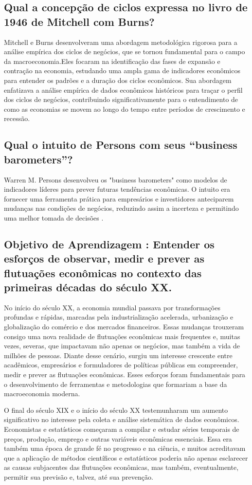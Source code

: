 \documentclass[12pt]{article}
\begin{document}
\subsection{\textbf{Qual a concepção de ciclos expressa no livro de 1946 de Mitchell com Burns?}}
Mitchell e Burns desenvolveram uma abordagem metodológica rigorosa para a análise empírica dos ciclos de negócios, que se tornou fundamental para o campo da macroeconomia.Eles focaram na identificação das fases de expansão e contração na economia, estudando uma ampla gama de indicadores econômicos para entender os padrões e a duração dos ciclos econômicos. Sua abordagem enfatizava a análise empírica de dados econômicos históricos para traçar o perfil dos ciclos de negócios, contribuindo significativamente para o entendimento de como as economias se movem ao longo do tempo entre períodos de crescimento e recessão.
\subsection{\textbf{Qual o intuito de Persons com seus “business barometers”?}}
Warren M. Persons desenvolveu os "business barometers" como modelos de indicadores líderes para prever futuras tendências econômicas. O intuito era fornecer uma ferramenta prática para empresários e investidores anteciparem mudanças nas condições de negócios, reduzindo assim a incerteza e permitindo uma melhor tomada de decisões .
\subsection{\textbf{Objetivo de Aprendizagem : Entender os esforços de observar, medir e prever as flutuações econômicas no contexto das primeiras décadas do século XX.}}
No início do século XX, a economia mundial passava por transformações profundas e rápidas, marcadas pela industrialização acelerada, urbanização e globalização do comércio e dos mercados financeiros. Essas mudanças trouxeram consigo uma nova realidade de flutuações econômicas mais frequentes e, muitas vezes, severas, que impactavam não apenas os negócios, mas também a vida de milhões de pessoas. Diante desse cenário, surgiu um interesse crescente entre acadêmicos, empresários e formuladores de políticas públicas em compreender, medir e prever as flutuações econômicas. Esses esforços foram fundamentais para o desenvolvimento de ferramentas e metodologias que formariam a base da macroeconomia moderna.

O final do século XIX e o início do século XX testemunharam um aumento significativo no interesse pela coleta e análise sistemática de dados econômicos. Economistas e estatísticos começaram a compilar e estudar séries temporais de preços, produção, emprego e outras variáveis econômicas essenciais. Essa era também uma época de grande fé no progresso e na ciência, e muitos acreditavam que a aplicação de métodos científicos e estatísticos poderia não apenas esclarecer as causas subjacentes das flutuações econômicas, mas também, eventualmente, permitir sua previsão e, talvez, até sua prevenção.
\end{document}

